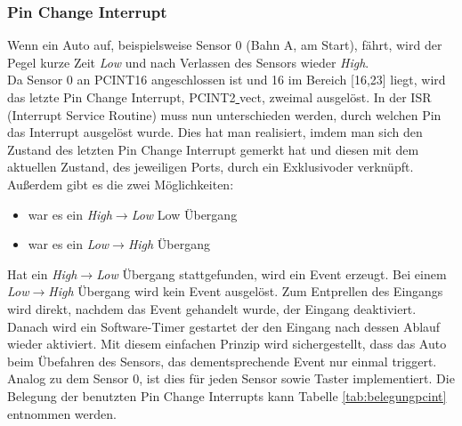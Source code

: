 \documentclass[a4paper, 11pt]{report}
\begin{document}
			\subsubsection {Pin Change Interrupt}\label{subsubsec:PCINT}
			Wenn ein Auto auf, beispielsweise Sensor 0 (Bahn A, am Start), fährt, wird der Pegel kurze Zeit \emph{Low} und nach Verlassen des Sensors wieder \emph{High}.\\ Da Sensor 0 an PCINT16 angeschlossen ist und 16 im Bereich [16,23] liegt, wird das letzte Pin Change Interrupt, PCINT2\underline{ }vect, zweimal ausgelöst. In der ISR (Interrupt Service Routine) muss nun unterschieden werden, durch welchen Pin das Interrupt ausgelöst wurde.
			Dies hat man realisiert, imdem man sich den Zustand des letzten Pin Change Interrupt gemerkt hat und diesen mit dem aktuellen Zustand, des jeweiligen Ports, durch ein Exklusivoder verknüpft.
			Außerdem gibt es die zwei Möglichkeiten:
				\begin{itemize}
					\item war es ein \emph{High$\rightarrow$Low} Low Übergang
					\item war es ein \emph{Low$\rightarrow$High} Übergang
				\end{itemize}
			Hat ein \emph{High$\rightarrow$Low} Übergang stattgefunden, wird ein Event erzeugt.
			Bei einem \emph{Low$\rightarrow$High} Übergang wird kein Event ausgelöst.
			Zum Entprellen des Eingangs wird direkt, nachdem das Event gehandelt wurde, der Eingang deaktiviert. Danach wird ein Software-Timer gestartet der den Eingang nach dessen Ablauf wieder aktiviert. Mit diesem einfachen Prinzip wird sichergestellt, dass das Auto beim Übefahren des Sensors, das dementsprechende Event nur einmal triggert.
			Analog zu dem Sensor 0, ist dies für jeden Sensor sowie Taster implementiert. Die Belegung der benutzten Pin Change Interrupts kann Tabelle \ref{tab:belegungpcint} entnommen werden.
\end{document}

